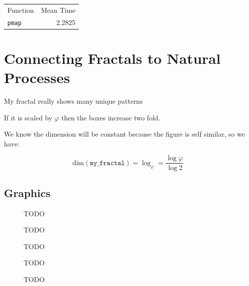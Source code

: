\documentclass[11pt]{article}
\begin{document}
\begin{center}
\begin{tabular}{lr}
Function & Mean Time\\
\texttt{pmap} & 2.2825\\
\end{tabular}

\end{center}
\section{Connecting Fractals to Natural Processes}
\label{my-fractal}
My fractal really shows many unique patterns

If it is scaled by \(\varphi\) then the boxes increase two fold.

We know the dimension will be constant because the figure is self similar, so we have:

\[
\mathrm{dim} (\mathtt{my\_fractal}) = \log_{\varphi}=\frac{\log \varphi}{\log 2}
\]
\subsection{Graphics}
\label{sec:org9276983}

\begin{figure}[htbp]
\centering

\caption{\label{My-Frac-GR}TODO}
\end{figure}

\begin{figure}[htbp]
\centering

\caption{\label{My-Frac-GR}TODO}
\end{figure}

\begin{figure}[htbp]
\centering

\caption{\label{My-Frac-GR}TODO}
\end{figure}

\begin{figure}[htbp]
\centering

\caption{\label{My-Frac-GR}TODO}
\end{figure}

\begin{figure}[htbp]
\centering

\caption{\label{My-Frac-GR}TODO}
\end{figure}
\end{document}
